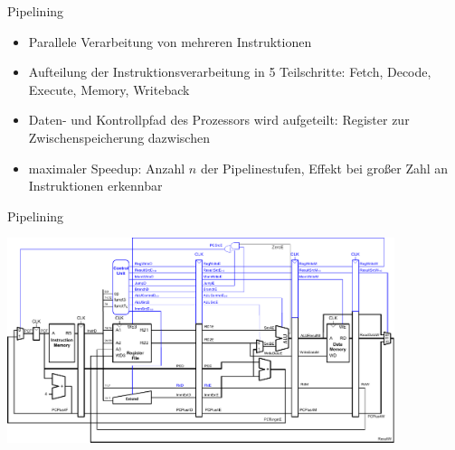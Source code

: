 \documentclass[
  german,            %
  aspectratio=169,    %
]{tumbeamer}
\begin{document}
\begin{frame}[fragile, c]{Pipelining}{}
	\begin{itemize}
		\item Parallele Verarbeitung von mehreren Instruktionen
		\item Aufteilung der Instruktionsverarbeitung in 5 Teilschritte: Fetch, Decode, Execute, Memory, Writeback
		\item Daten- und Kontrollpfad des Prozessors wird aufgeteilt: Register zur Zwischenspeicherung dazwischen
		\item maximaler Speedup: Anzahl $n$ der Pipelinestufen, Effekt bei großer Zahl an Instruktionen erkennbar
	\end{itemize}

\end{frame}

\begin{frame}[fragile, c]{Pipelining}{}
	\begin{center}
		\includegraphics[width=0.85\textwidth]{w11_pipelined.pdf}
	\end{center}
\end{frame}
\end{document}
